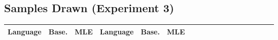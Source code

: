 \documentclass[11pt,letterpaper]{article}
\begin{document}
%
%
%
%
%
%
%
%














\subsection{Samples Drawn (Experiment 3)}



\begin{center}
\begin{tabular}{l|ll||l|llllllllllllll}
	Language & Base. & MLE & Language & Base. & MLE \\ \hline

\end{tabular}
	\label{tab:samples}
\end{center}
\end{document}
